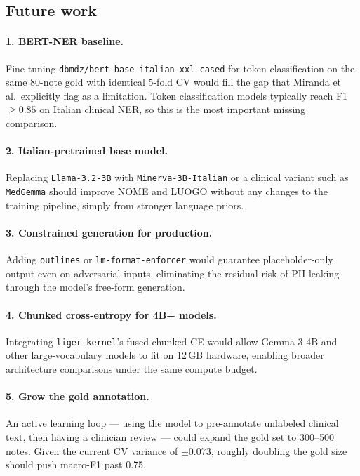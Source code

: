 \documentclass[11pt,a4paper]{article}
\begin{document}
\subsection{Future work}

\paragraph{1. BERT-NER baseline.} Fine-tuning \texttt{dbmdz/bert-base-italian-xxl-cased} for token classification on the same 80-note gold with identical 5-fold CV would fill the gap that Miranda et al.\ explicitly flag as a limitation. Token classification models typically reach F1 $\geq 0.85$ on Italian clinical NER, so this is the most important missing comparison.

\paragraph{2. Italian-pretrained base model.} Replacing \texttt{Llama-3.2-3B} with \texttt{Minerva-3B-Italian} or a clinical variant such as \texttt{MedGemma} should improve NOME and LUOGO without any changes to the training pipeline, simply from stronger language priors.

\paragraph{3. Constrained generation for production.} Adding \texttt{outlines} or \texttt{lm-format-enforcer} would guarantee placeholder-only output even on adversarial inputs, eliminating the residual risk of PII leaking through the model's free-form generation.

\paragraph{4. Chunked cross-entropy for 4B+ models.} Integrating \texttt{liger-kernel}'s fused chunked CE would allow Gemma-3 4B and other large-vocabulary models to fit on 12\,GB hardware, enabling broader architecture comparisons under the same compute budget.

\paragraph{5. Grow the gold annotation.} An active learning loop — using the model to pre-annotate unlabeled clinical text, then having a clinician review — could expand the gold set to 300--500 notes. Given the current CV variance of $\pm 0.073$, roughly doubling the gold size should push macro-F1 past 0.75.
\end{document}
